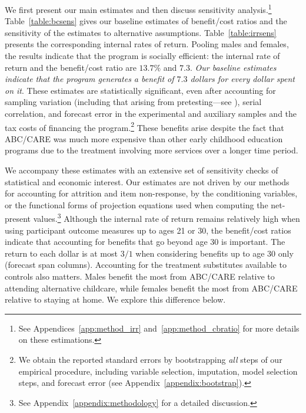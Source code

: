 We first present our main estimates and then discuss sensitivity analysis.\footnote{See Appendices~\ref{app:method_irr} and~\ref{app:method_cbratio} for more details on these estimations.} Table~\ref{table:bcsens} gives our baseline estimates of benefit/cost ratios and the sensitivity of the estimates to alternative assumptions. Table~\ref{table:irrsens} presents the corresponding internal rates of return. Pooling males and females, the results indicate that the program is socially efficient: the internal rate of return and the benefit/cost ratio are $13.7\%$ and $7.3$. \textit{Our baseline estimates indicate that the program generates a benefit of $7.3$ dollars for every dollar spent on it}. These estimates are statistically significant, even after accounting for sampling variation (including that arising from pretesting---see \citealp{Sullivan-etal_2003_IJF-Forecasting}), serial correlation, and forecast error in the experimental and auxiliary samples and the tax costs of financing the program.\footnote{We obtain the reported standard errors by bootstrapping \emph{all} steps of our empirical procedure, including variable selection, imputation, model selection steps, and forecast error (see  Appendix~\ref{appendix:bootstrap}).} These benefits arise despite the fact that ABC/CARE was much more expensive than other early childhood education programs due to the treatment involving more services over a longer time period.

We accompany these estimates with an extensive set of sensitivity checks of statistical and economic interest. Our estimates are not driven by our methods for accounting for attrition and item non-response, by the conditioning variables, or the functional forms of projection equations used when computing the net-present values.\footnote{See Appendix~\ref{appendix:methodology} for a detailed discussion.} Although the internal rate of return remains relatively high when using participant outcome measures up to ages 21 or 30, the benefit/cost ratios indicate that accounting for benefits that go beyond age 30 is important. The return to each dollar is at most $3/1$ when considering benefits up to age 30 only (forecast span columns). Accounting for the treatment substitutes available to controls also matters. Males benefit the most from ABC/CARE relative to attending alternative childcare, while females benefit the most from ABC/CARE relative to staying at home. We explore this difference below.

